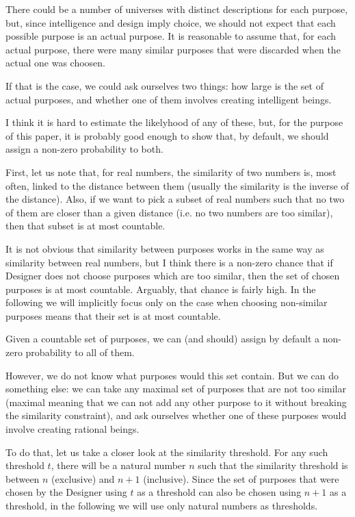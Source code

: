 \documentclass[a4paper
,draft
]{article}
\newcommand{\paper}[1]{paper}
\begin{document}
There could be a number of universes with
distinct descriptions for each purpose, but, since intelligence and design
imply choice, we should not expect that each
possible purpose is an actual purpose.
It is reasonable to assume that, for each actual purpose,
there were many similar purposes that were discarded when the actual one
was choosen.

If that is the case, we could ask ourselves two things:
how large is the set of actual
purposes, and whether one of them involves creating intelligent beings.

I think it is hard to estimate the likelyhood of any of these, but, for the
purpose of this \paper{}, it is probably good enough to show that, by default,
we should assign a non-zero probability to both.

First, let us note that, for real numbers, the similarity of two numbers
is, most often, linked to the distance between them
(usually the similarity is the inverse of the distance).
Also, if we want to pick a subset of real numbers such that no two of them are
closer than a given distance (i.e. no two numbers are too similar),
then that subset is at most countable.

It is not obvious that
similarity between purposes works in the same way as similarity between
real numbers, but I think there is a non-zero chance
that if Designer does not choose purposes which are too similar,
then the set of chosen purposes is at most countable.
Arguably, that chance is fairly high.
In the following we will implicitly focus only on the case when choosing
non-similar purposes means that their set is at most countable.

Given a countable set of purposes, we can (and should) assign by default
a non-zero probability to all of them.

However, we do not know what purposes would this set contain. But we can do
something else: we can take any maximal set of purposes that are not too similar
(maximal meaning that we can not add any other purpose to it without breaking
the similarity constraint), and ask ourselves whether one of these
purposes would involve creating rational beings.

To do that, let us take a closer look at the similarity threshold.
For any such threshold $t$,
there will be a natural number $n$ such that the similarity threshold is between
$n$ (exclusive) and $n+1$ (inclusive).
Since the set of purposes that were chosen by the Designer using $t$ as a
threshold can also be chosen
using $n+1$ as a threshold, in the following we will use only natural numbers
as thresholds.
\end{document}
